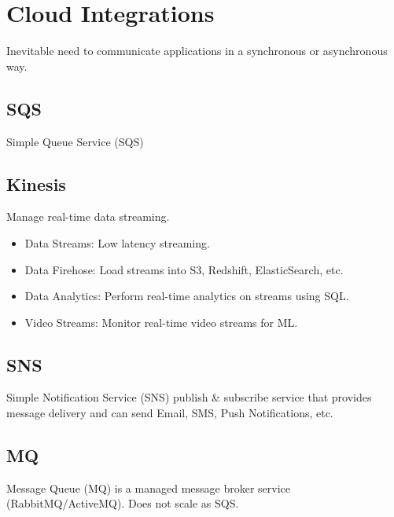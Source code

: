 \section{Cloud Integrations}\label{sec:cloud-integrations}
Inevitable need to communicate applications in a synchronous or asynchronous way.

\subsection{SQS}\label{subsec:sqs}
Simple Queue Service (SQS)

\subsection{Kinesis}\label{subsec:kinesis}
Manage real-time data streaming.

\begin{itemize}
    \item{Data Streams:} Low latency streaming.
    \item{Data Firehose:} Load streams into S3, Redshift, ElasticSearch, etc.
    \item{Data Analytics:} Perform real-time analytics on streams using SQL\@.
    \item{Video Streams:} Monitor real-time video streams for ML\@.
\end{itemize}

\subsection{SNS}\label{subsec:sns}
Simple Notification Service (SNS) publish \& subscribe service that provides message delivery and
can send Email, SMS, Push Notifications, etc.

\subsection{MQ}\label{subsec:mq}
Message Queue (MQ) is a managed message broker service (RabbitMQ/ActiveMQ).
Does not scale as SQS\@.

